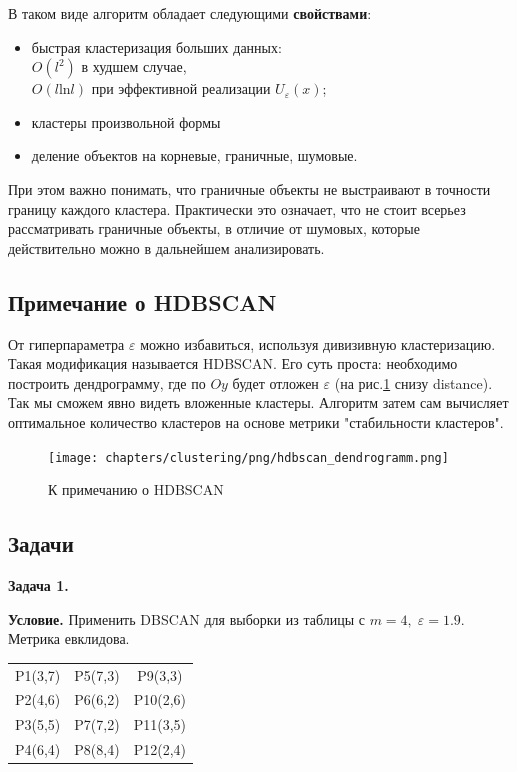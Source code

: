 В таком виде алгоритм обладает следующими \textbf{свойствами}:
\begin{itemize}
    \item быстрая кластеризация больших данных: \\$O(l^2)$ в худшем случае, \\ $O(l \mathrm{ln} l)$ при эффективной реализации $U_\varepsilon (x)$;
    \item кластеры произвольной формы
    \item деление объектов на корневые, граничные, шумовые.
\end{itemize}

При этом важно понимать, что граничные объекты не выстраивают в точности границу каждого кластера. Практически это означает, что не стоит всерьез рассматривать граничные объекты, в отличие от шумовых, которые действительно можно в дальнейшем анализировать.

\subsection{Примечание о HDBSCAN} 
От гиперпараметра $\varepsilon$ можно избавиться, используя дивизивную кластеризацию. Такая модификация называется HDBSCAN. Его суть проста: необходимо построить дендрограмму, где по $Oy$ будет отложен $\varepsilon$ (на рис.\ref{fig:hdbdendro} снизу distance). Так мы сможем явно видеть вложенные кластеры. Алгоритм затем сам вычисляет оптимальное количество кластеров на основе метрики "стабильности кластеров".

\begin{figure}[ht!]
    \centering
    \texttt{[image: chapters/clustering/png/hdbscan\_dendrogramm.png]}
    \caption{К примечанию о HDBSCAN}
    \label{fig:hdbdendro}
\end{figure}
\subsection{Задачи}
\textbf{Задача 1.}

\textbf{Условие.} Применить DBSCAN для выборки из таблицы с $m=4,\;\varepsilon=1.9$. Метрика евклидова.

\begin{center}
\begin{tabular}{ |c|c|c| } 
 \hline
 P1(3,7) & P5(7,3) & P9(3,3) \\ 
 P2(4,6) & P6(6,2) & P10(2,6) \\ 
 P3(5,5) & P7(7,2) & P11(3,5) \\ 
 P4(6,4) & P8(8,4) & P12(2,4) \\ 
 \hline
\end{tabular}
\end{center}

